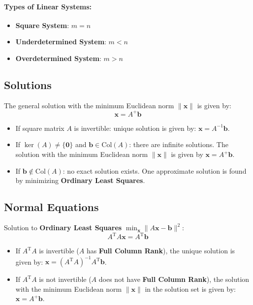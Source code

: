 \documentclass{article}
\begin{document}
\paragraph{Types of Linear Systems:}
\begin{itemize}
    \item \textbf{Square System}: $m = n$
    \item \textbf{Underdetermined System}: $m < n$
    \item \textbf{Overdetermined System}: $m > n$
\end{itemize}

\subsection{Solutions}
The general solution with the minimum Euclidean norm $\|\mathbf{x}\|$ is given by:
\[
    \mathbf{x} = A^+ \mathbf{b}
\]
\begin{itemize}
    \item If square matrix $A$ is invertible: unique solution is given by: $\mathbf{x} = A^{-1} \mathbf{b}$.
    \item If $\ker(A) \neq \{\mathbf{0}\}$ and $\mathbf{b} \in \text{Col}(A)$: there are infinite solutions. The solution with the minimum Euclidean norm $\|\mathbf{x}\|$ is given by $\mathbf{x} = A^+ \mathbf{b}$.
    \item If $\mathbf{b} \notin \text{Col}(A)$: no exact solution exists. One approximate solution is found by minimizing \textbf{Ordinary Least Squares}.
\end{itemize}

\subsection{Normal Equations}
Solution to \textbf{Ordinary Least Squares} $\displaystyle \min_{\mathbf{x}} \|A\mathbf{x} - \mathbf{b}\|^2$:
\[
    A^{\mathrm{T}} A \mathbf{x} = A^{\mathrm{T}} \mathbf{b}
\]
\begin{itemize}
    \item If $A^{\mathrm{T}} A$ is invertible ($A$ has \textbf{Full Column Rank}), the unique solution is given by: $\mathbf{x} = (A^{\mathrm{T}} A)^{-1} A^{\mathrm{T}} \mathbf{b}$.
    \item If $A^{\mathrm{T}} A$ is not invertible ($A$ does not have \textbf{Full Column Rank}), the solution with the minimum Euclidean norm $\|\mathbf{x}\|$ in the solution set is given by: $\mathbf{x} = A^+ \mathbf{b}$.
\end{itemize}
\end{document}
